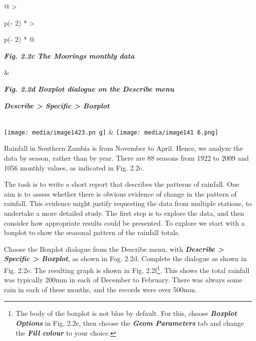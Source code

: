 \documentclass[
  letterpaper,
  DIV=11,
  numbers=noendperiod]{scrreprt}
\begin{document}
\begin{longtable}[]{@{}
  >{\raggedright\arraybackslash}p{(\columnwidth - 2\tabcolsep) * }
  >{\raggedright\arraybackslash}p{(\columnwidth - 2\tabcolsep) * }@{}}
\toprule\noalign{}
\begin{minipage}[b]{\linewidth}\raggedright
\textbf{\emph{Fig. 2.2c The Moorings monthly data}}
\end{minipage} & \begin{minipage}[b]{\linewidth}\raggedright
\textbf{\emph{Fig. 2.2d Boxplot dialogue on the Describe menu}}

\textbf{\emph{Describe \textgreater{} Specific \textgreater{} Boxplot}}
\end{minipage} \\
\midrule\noalign{}
\endhead
\bottomrule\noalign{}
\endlastfoot
\texttt{[image: media/image1423.pn g]}
&
\texttt{[image: media/image141 6.png]} \\
\end{longtable}

Rainfall in Southern Zambia is from November to April. Hence, we analyze
the data by season, rather than by year. There are 88 seasons from 1922
to 2009 and 1056 monthly values, as indicated in Fig. 2.2c.

The task is to write a short report that describes the patterns of
rainfall. One aim is to assess whether there is obvious evidence of
change in the pattern of rainfall. This evidence might justify
requesting the data from multiple stations, to undertake a more detailed
study. The first step is to explore the data, and then consider how
appropriate results could be presented. To explore we start with a
boxplot to show the seasonal pattern of the rainfall totals.

Choose the Boxplot dialogue from the Describe menu, with
\textbf{\emph{Describe \textgreater{} Specific \textgreater{} Boxplot}},
as shown in Fog. 2.2d. Complete the dialogue as shown in Fig. 2.2e. The
resulting graph is shown in Fig. 2.2f\footnote{The body of the boxplot
  is not blue by default. For this, choose \textbf{\emph{Boxplot
  Options}} in Fig. 2.2e, then choose the \textbf{\emph{Geom
  Parameters}} tab and change the \textbf{\emph{Fill colour}} to your
  choice.}. This shows the total rainfall was typically 200mm in each of
December to February. There was always some rain in each of these
months, and the records were over 500mm.
\end{document}
